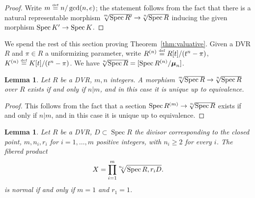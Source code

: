 \documentclass{amsart}
\numberwithin{equation}{section}
\numberwithin{subsection}{section}
\newtheorem{lemma}[theorem]{Lemma}
\theoremstyle{definition}
\theoremstyle{remark}
\newcommand\arr{\ifinner\to\else\longrightarrow\fi}
\newcommand{\eqdef}{\mathrel{\smash{\overset{\mathrm{\scriptscriptstyle def}} =}}}
\newcommand\spec{\operatorname{Spec}}
\newcommand{\mmu}{\boldsymbol{\mu}}
\newcommand\radice[2][\relax]{\hspace{-1.5pt}\sqrt[\uproot{2}#1]{#2}}
\begin{document}
	\begin{proof}
		Write $m \eqdef n/\gcd(n,e)$; the statement follows from the fact that there is a natural representable morphism $\radice[m]{\spec R'}\to\radice[n]{\spec R}$ inducing the given morphism $\spec K' \arr \spec K$.
	\end{proof}



We spend the rest of this section proving Theorem~\ref{thm:valuative}. Given a DVR $R$ and $\pi\in R$ a uniformizing parameter, write $R^{(n)} \eqdef R[t]/(t^{n}-\pi)$, $K^{(n)} \eqdef K[t]/(t^{n}-\pi)$. We have $\radice[n]{\spec R} = [\spec R^{(n)}/\mmu_{n}]$. 

\begin{lemma}\label{rootmor}
	Let $R$ be a DVR, $m,n$ integers. A morphism $\radice[m]{\spec R}\to\radice[n]{\spec R}$ over $R$ exists if and only if $n|m$, and in this case it is unique up to equivalence.
\end{lemma}

\begin{proof}
	This follows from the fact that a section $\spec R^{(m)}\to\radice[n]{\spec R}$ exists if and only if $n|m$, and in this case it is unique up to equivalence.
\end{proof}


\begin{lemma}\label{normalroot}
	Let $R$ be a DVR, $D\subset \spec R$ the divisor corresponding to the closed point, $m,n_{i},r_{i}$ for $i=1,\dots,m$ positive integers, with $n_{i}\ge 2$ for every $i$. The fibered product
	\[X=\prod_{i=1}^{m}\radice[n_{i}]{\spec R,r_{i}D}.\]
	is normal if and only if $m=1$ and $r_{1}=1$.
\end{lemma}
\end{document}
